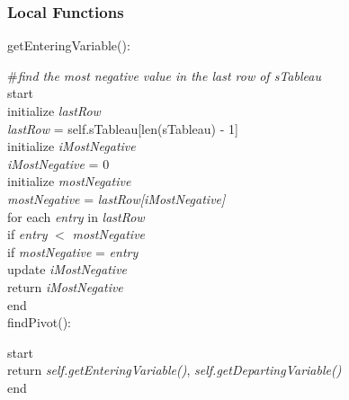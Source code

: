 \documentclass[12pt, titlepage]{article}
\begin{document}
\subsubsection{Local Functions}

\noindent 
getEnteringVariable():

\textcolor{pyComment}{\#\textit{find the most negative value in the last row of 
sTableau}} \\

\hspace*{0.3cm} start \\
\hspace*{2cm} initialize \textit{lastRow} \\
\hspace*{2cm} \textit{lastRow} = self.sTableau[len(sTableau) - 1] \\
\hspace*{2cm} initialize \textit{iMostNegative} \\
\hspace*{2cm} \textit{iMostNegative} = 0 \\
\hspace*{2cm} initialize \textit{mostNegative} \\
\hspace*{2cm} \textit{mostNegative} = \textit{lastRow[iMostNegative]} \\
\hspace*{2cm} for each \textit{entry} in \textit{lastRow} \\
\hspace*{3cm} if \textit{entry} $<$ \textit{mostNegative}\\
\hspace*{4cm} if \textit{mostNegative} = \textit{entry}\\
\hspace*{3cm} update \textit{iMostNegative}\\
\hspace*{2cm} return \textit{iMostNegative} \\
\hspace*{0.9cm} end \\

\noindent 
findPivot():

\hspace*{0.3cm} start \\
\hspace*{2cm} return \textit{self.getEnteringVariable()}, 
\textit{self.getDepartingVariable()} \\
\hspace*{0.9cm} end \\
\end{document}
